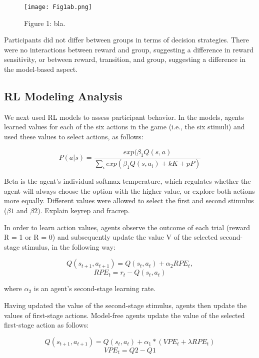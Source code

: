 \documentclass[11pt]{article} %
\begin{document}
\begin{figure}
	\texttt{[image: Fig1ab.png]}
	\caption{Figure 1: bla.}
	\label{basicSwitchStay}
\end{figure}

Participants did not differ between groups in terms of decision strategies. There were no interactions between reward and group, suggesting a difference in reward sensitivity, or between reward, transition, and group, suggesting a difference in the model-based aspect. 

\subsection{RL Modeling Analysis}
We next used RL models to assess participant behavior. In the models, agents learned values for each of the six actions in the game (i.e., the six stimuli) and used these values to select actions, as follows:

\begin{equation}
P(a|s) = \frac{exp(\beta_{1} Q(s,a)}{\sum_{i} exp(\beta_{1} Q(s,a_{i}) + k K + p P)}
\end{equation}

Beta is the agent's individual softmax temperature, which regulates whether the agent will always choose the option with the higher value, or explore both actions more equally. Different values were allowed to select the first and second stimulus ($\beta1$ and $\beta2$). Explain keyrep and fracrep.

In order to learn action values, agents observe the outcome of each trial (reward R = 1 or R = 0) and subsequently update the value V of the selected second-stage stimulus, in the following way:

\begin{equation}
Q(s_{t+1}, a_{t+1}) = Q(s_{t}, a_{t}) + \alpha_{2} RPE_{t},
\end{equation}
\begin{equation}
RPE_{t} = r_{t} - Q(s_{t}, a_{t})
\end{equation}

where $ \alpha_{2} $ is an agent's second-stage learning rate.

Having updated the value of the second-stage stimulus, agents then update the values of first-stage actions. Model-free agents update the value of the selected first-stage action as follows:

\begin{equation}
Q(s_{t+1}, a_{t+1}) = Q(s_{t}, a_{t}) + \alpha_{1} * (VPE_{t} + \lambda RPE_{t})
\end{equation}
\begin{equation}
VPE_{t} = Q2 - Q1
\end{equation}
\end{document}
